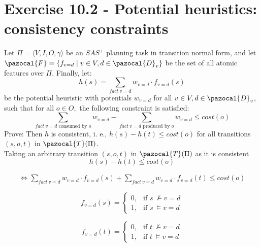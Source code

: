 \documentclass[11pt,a4paper]{article}
\begin{document}
\section*{Exercise 10.2 - Potential heuristics: consistency constraints}
Let $\Pi = \langle V, I, O, \gamma \rangle$ be an $SAS^+$ planning task in transition normal form, and let $\pazocal{F} = \{f_{v=d} \mid v \in V, d \in \pazocal{D}_v\}$ be the set of all atomic features over $\Pi$. Finally, let:
\[h(s) = \sum_{fact\:v=d} w_{v=d} \cdot f_{v=d}(s) \]
be the potential heuristic with potentials $w_{v=d}$ for all $v \in V , d \in \pazocal{D}_v$, such that for all $o \in O,$ the following constraint is satisfied:
\[\sum_{fact\:v=d \text{ consumed by } o} w_{v=d} - \sum_{fact\:v=d \text{ produced by } o} w_{v=d} \leq cost(o)\]
Prove: Then $h$ is consistent, i. e., $h(s) - h(t) \leq cost(o)$ for all transitions $(s, o, t)$ in $\pazocal{T}(\Pi)$.\\

Taking an arbitrary transition $(s, o, t)$ in $\pazocal{T}(\Pi)$ as it is consistent\\

\[		h(s) - h(t) \leq cost(o) \]

\begin{equation*}
	\begin{aligned}
		\iff \sum_{fact\:v=d} w_{v=d} \cdot f_{v=d}(s) + \sum_{fact\:v=d} w_{v=d} \cdot f_{v=d}(t) \leq cost(o)
	\end{aligned}
\end{equation*}

\begin{multicols}{2}
	\begin{equation*}
		f_{v=d}(s)=
		\begin{cases}
		0, & \text{if } s\: \not\models v=d \\
		1, & \text{if } s\: \models v=d
		\end{cases}
	\end{equation*}

	\begin{equation*}
		f_{v=d}(t)=
		\begin{cases}
		0, & \text{if } t\: \not\models v=d \\
		1, & \text{if } t\: \models v=d
		\end{cases}
	\end{equation*}
\end{multicols}
\end{document}

